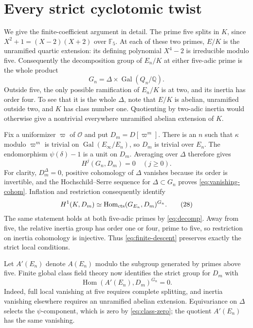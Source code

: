 \documentclass[11pt]{article}
\newcommand{\Q}{\mathbb Q}
\newcommand{\F}{\mathbb F}
\newcommand{\Gal}{\operatorname{Gal}}
\begin{document}
\section{Every strict cyclotomic twist}

We give the finite-coefficient argument in detail. The prime five splits
in $K$, since $X^2+1=(X-2)(X+2)$ over $\F_5$.
At each of these two primes, $E/K$ is the unramified quartic extension:
its defining polynomial $X^4-2$ is irreducible modulo five.
Consequently the decomposition group of $E_n/K$ at either five-adic
prime is the whole product
\[
 G_n=\Delta\times\Gal(Q_n/\Q).
 \tag{26}\label{eq:decomp}
\]
Outside five, the only possible ramification of $E_n/K$ is at two,
and its inertia has order four. To see that it is the whole $\Delta$,
note that $E/K$ is abelian, unramified outside two, and $K$ has class
number one. Quotienting by two-adic inertia would otherwise give a
nontrivial everywhere unramified abelian extension of $K$.

Fix a uniformizer $\varpi$ of $\mathcal O$ and put $D_m=D[\varpi^m]$.
There is an $n$ such that $\kappa$ modulo $\varpi^m$ is trivial on
$\Gal(E_\infty/E_n)$, so $D_m$ is trivial over $E_n$.
The endomorphism $\psi(\delta)-1$ is a unit on $D_m$.
Averaging over $\Delta$ therefore gives
\[
 H^j(G_n,D_m)=0\quad(j\ge0).
 \tag{27}\label{eq:vanishing-cohom}
\]
For clarity, $D_m^\Delta=0$, positive cohomology of $\Delta$ vanishes
because its order is invertible, and the Hochschild--Serre sequence
for $\Delta\subset G_n$ proves \eqref{eq:vanishing-cohom}.
Inflation and restriction consequently identify
\[
 H^1(K,D_m)\simeq
 \operatorname{Hom}_{\rm cts}(G_{E_n},D_m)^{G_n}.
 \tag{28}\label{eq:finite-descent}
\]
The same statement holds at both five-adic primes by
\eqref{eq:decomp}. Away from five, the relative inertia group has
order one or four, prime to five, so restriction on inertia cohomology
is injective. Thus \eqref{eq:finite-descent} preserves exactly the
strict local conditions.

Let $A'(E_n)$ denote $A(E_n)$ modulo the subgroup generated by primes
above five. Finite global class field theory now identifies the strict
group for $D_m$ with
\[
 \operatorname{Hom}(A'(E_n),D_m)^{G_n}=0.
 \tag{29}\label{eq:finite-Selmer}
\]
Indeed, full local vanishing at five requires complete splitting, and
inertia vanishing elsewhere requires an unramified abelian extension.
Equivariance on $\Delta$ selects the $\psi$-component, which is zero
by \eqref{eq:class-zero}; the quotient $A'(E_n)$ has the same vanishing.
\end{document}
